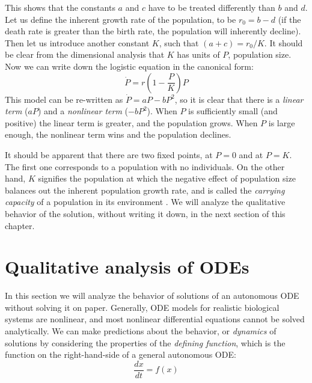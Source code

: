 \documentclass[
  letterpaper,
  DIV=11,
  numbers=noendperiod]{scrreprt}
\begin{document}
This shows that the constants \(a\) and \(c\) have to be treated
differently than \(b\) and \(d\). Let us define the inherent growth rate
of the population, to be \(r_0=b-d\) (if the death rate is greater than
the birth rate, the population will inherently decline). Then let us
introduce another constant \(K\), such that \((a+c)=r_0/K\). It should
be clear from the dimensional analysis that \(K\) has units of \(P\),
population size. Now we can write down the logistic equation in the
canonical form: \begin{equation}
\dot P = r\left(1-\frac{P}{K}\right)P
\label{eq:log_cont_model}
\end{equation} This model can be re-written as \(\dot P = aP -bP^2\),
so it is
clear that there is a \emph{linear term} (\(aP\)) and a \emph{nonlinear
term} (\(-bP^2\)). When \(P\) is sufficiently small (and positive) the
linear term is greater, and the population grows. When \(P\) is large
enough, the nonlinear term wins and the population declines.

It should be apparent that there are two fixed points, at \(P=0\) and at
\(P=K\). The first one corresponds to a population with no individuals.
On the other hand, \(K\) signifies the population at which the negative
effect of population size balances out the inherent population growth
rate, and is called the 
\emph{carrying capacity} of a population in its environment
\cite{otto_biologists_2007}. We will analyze the qualitative behavior of
the solution, without writing it down, in the next section of this
chapter.

\hypertarget{qualitative-analysis-of-odes}{%
\section{Qualitative analysis of
ODEs}\label{qualitative-analysis-of-odes}}

\label{sec:math16}

In this section we will analyze the behavior of solutions of an
autonomous ODE without solving it on paper. Generally, ODE models for
realistic biological systems are nonlinear, and most nonlinear
differential equations cannot be solved analytically. We can make
predictions about the behavior, or \emph{dynamics} of solutions by
considering the properties of the
 \emph{defining
function}, which is the function on the right-hand-side of a general
autonomous ODE: \[ \frac{dx}{dt} = f(x)\]
\end{document}
